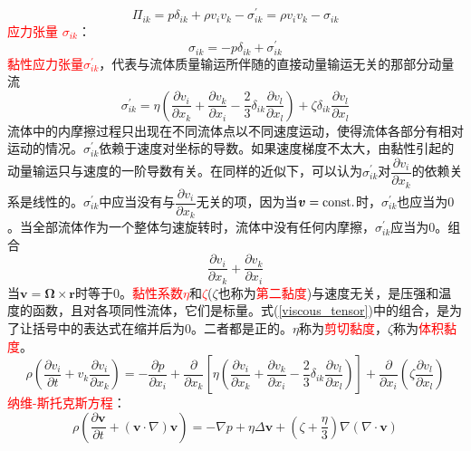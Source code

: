 \documentclass[12pt,a4paper]{article}
\renewcommand{\vec}[1]{\boldsymbol{#1}}
\begin{document}
\begin{equation}
\Pi_{ik} = p\delta_{ik} +\rho v_i v_k -\sigma_{ik}^\prime = \rho v_i v_k -\sigma_{ik}
\end{equation}
\textcolor{red}{应力张量 $\sigma_{ik}$}：
\begin{equation}
\sigma_{ik} = -p\delta_{ik} +\sigma_{ik}^\prime
\end{equation}
\textcolor{red}{黏性应力张量$\sigma_{ik}^\prime$}，代表与流体质量输运所伴随的直接动量输运无关的那部分动量流
\begin{equation}
\sigma_{ik}^\prime = \eta \left(\frac{\partial v_i}{\partial x_k} +\frac{\partial v_k}{\partial x_i} -\frac{2}{3} \delta_{ik} \frac{\partial v_l}{\partial x_l}\right) +\zeta \delta_{ik} \frac{\partial v_l}{\partial x_l}
\label{viscous_tensor}
\end{equation}
流体中的内摩擦过程只出现在不同流体点以不同速度运动，使得流体各部分有相对运动的情况。$\sigma_{ik}^\prime$依赖于速度对坐标的导数。如果速度梯度不太大，由黏性引起的动量输运只与速度的一阶导数有关。在同样的近似下，可以认为$\sigma_{ik}^\prime$对$\dfrac{\partial v_i}{\partial x_k}$的依赖关系是线性的。$\sigma_{ik}^\prime$中应当没有与$\dfrac{\partial v_i}{\partial x_k}$无关的项，因为当$\vec{v} = \rm const.$时，$\sigma_{ik}^\prime$也应当为$0$。当全部流体作为一个整体匀速旋转时，流体中没有任何内摩擦，$\sigma_{ik}^\prime$应当为$0$。组合
\begin{equation*}
\frac{\partial v_i}{\partial x_k} +\frac{\partial v_k}{\partial x_i} 
\end{equation*}
当$\vec{v} = \vec{\Omega} \times \vec{r}$时等于$0$。\textcolor{red}{黏性系数$\eta$}和\textcolor{red}{$\zeta$}($\zeta$也称为\textcolor{red}{第二黏度})与速度无关，是压强和温度的函数，且对各项同性流体，它们是标量。式(\ref{viscous_tensor})中的组合，是为了让括号中的表达式在缩并后为$0$。二者都是正的。$\eta$称为\textcolor{red}{剪切黏度}，$\zeta$称为\textcolor{red}{体积黏度}。
\begin{equation}
\rho \left(\frac{\partial v_i}{\partial t} +v_k\frac{\partial v_i}{\partial x_k} \right) = -\frac{\partial p}{\partial x_i} +\frac{\partial }{\partial x_k} \left[\eta \left( \frac{\partial v_i}{\partial x_k} +\frac{\partial v_k}{\partial x_i} -\frac{2}{3} \delta_{ik} \frac{\partial v_l}{\partial x_l} \right) \right] +\frac{\partial }{\partial x_i}\left(\zeta \frac{\partial v_l}{\partial x_l}  \right) 
\end{equation}
\textcolor{red}{纳维-斯托克斯方程}：
\begin{equation}
\rho \left(\frac{\partial \vec{v} }{\partial t} + (\vec{v}\cdot \nabla) \vec{v} \right) = -\nabla p +\eta \Delta \vec{v} +\left(\zeta +\frac{\eta}{3} \right)\nabla(\nabla \cdot \vec{v})
\label{NS_gen}
\end{equation}
\end{document}
